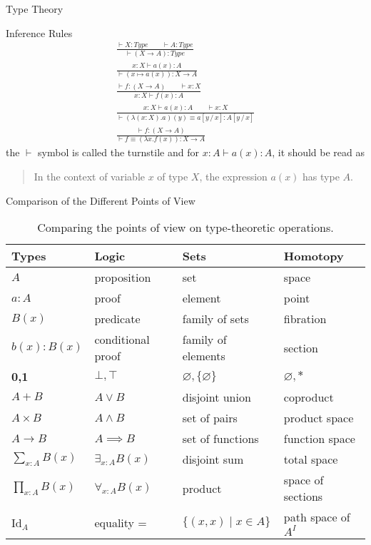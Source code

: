 \documentclass[10pt]{beamer}
\begin{document}
\begin{frame}{Type Theory}
\begin{block}{Inference Rules}
\begin{align*}
\frac{\vdash X: Type\qquad \vdash A:Type}{\vdash (X \to A): Type}\tag{Type Formation}\\
\frac{x:X\vdash a(x):A}{\vdash (x \mapsto a(x)):X \to A} \tag{Type Introduction}\\
\frac{\vdash f:(X \to A) \qquad \vdash x:X}{x:X \vdash f(x):A}\tag{Type Elimination}\\
\frac{x:X\vdash a(x):A \qquad \vdash x:X}{\vdash (\lambda(x:X).a)(y)\equiv a[y\,/\, x]:A[y\,/\, x]}\tag{Type Computation}\\
\frac{\vdash f: (X \to A)}{\vdash f \equiv (\lambda x.f(x)):X \to A} \tag{Uniqueness}
\end{align*}
the $\vdash$ symbol is called the turnstile and for $x:A\vdash a(x):A$, it should be read as 
\begin{quote}
\small In the context of variable $x$ of type $X$, the expression $a(x)$ has type $A$.
\end{quote}
\end{block}
\end{frame}



\begin{frame}{Comparison of the Different Points of View}
\begin{table}[h]
\centering
\small
\begin{tabular}{llll}
\hline
Types & Logic & Sets & Homotopy\\
\hline
$A$ & proposition & set & space\\
$a: A$  &proof  &element  &point  \\  
$B(x)$    & predicate &family of sets  &fibration  \\
$b(x):B(x)$      &conditional proof  & family of elements &section  \\
\textbf{0,1} &$\bot, \top$  & $\varnothing,\{\varnothing\}$ &$\varnothing, \ast$  \\
 $A + B$    & $A \vee B$ & disjoint union & coproduct \\
$A \times B$    & $A \wedge B$ & set of pairs & product space \\
$A \to B$    & $A \implies B$ & set of functions & function space \\
$\sum_{x:A}B(x)$      & $\exists_{x:A}B(x)$ & disjoint sum & total space \\
$\prod_{x:A}B(x)$       & $\forall_{x:A}B(x)$ & product & space of sections \\
Id$_{A}$   & equality = & $\{(x,x)\mid x \in A\}$ &  path space of $A^I$\\
\hline
\end{tabular}
\caption{Comparing the points of view on type-theoretic operations.}
\end{table}
\end{frame}
\end{document}
